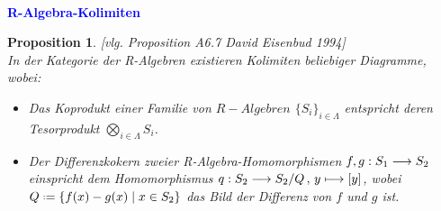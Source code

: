 \documentclass[10pt,a4paper]{report}
\newcommand{\ModulsOfDifferenzials}{David Eisenbud 1994}
\newcounter{Aussage}[chapter]
\newtheorem{prop}[Aussage]{Proposition}
\newcommand{\functionfront}[3]{\nolinebreak{#1:#2 \longrightarrow #3}}
\newcommand{\function}[5]{\nolinebreak{#1:#2 \longrightarrow #3 \, , \, #4 \longmapsto #5}}
\newcommand*{\defeq}{\mathrel{\vcenter{\baselineskip0.5ex \lineskiplimit0pt
                     \hbox{\scriptsize.}\hbox{\scriptsize.}}}%
                     =}
\begin{document}
\ \\
\textcolor{blue}{\textbf{R-Algebra-Kolimiten}}
\begin{prop} \label{R-Algebra-Kolimiten} \textit{[vlg. Proposition A6.7 \ModulsOfDifferenzials]}\\
In der Kategorie der R-Algebren existieren Kolimiten beliebiger Diagramme, wobei:
\begin{itemize}
\item[\textbf{1.}] Das Koprodukt einer Familie von $R-Algebren$ $\lbrace S_i \rbrace_{i \in \Lambda}$ entspricht deren Tesorprodukt $\bigotimes_{i \in \Lambda} S_i$. 
\item[\textbf{2.}] Der Differenzkokern zweier R-Algebra-Homomorphismen $\functionfront{f,g}{S_1}{S_2}$ einspricht dem Homomorphismus $\function{q}{S_2}{S_2/Q}{y}{[y]}$, wobei $Q \defeq \lbrace f(x) - g(x)\mid x \in S_2 \rbrace$ das Bild der Differenz von $f$ und $g$ ist.
\end{itemize}
\end{prop}
\end{document}
